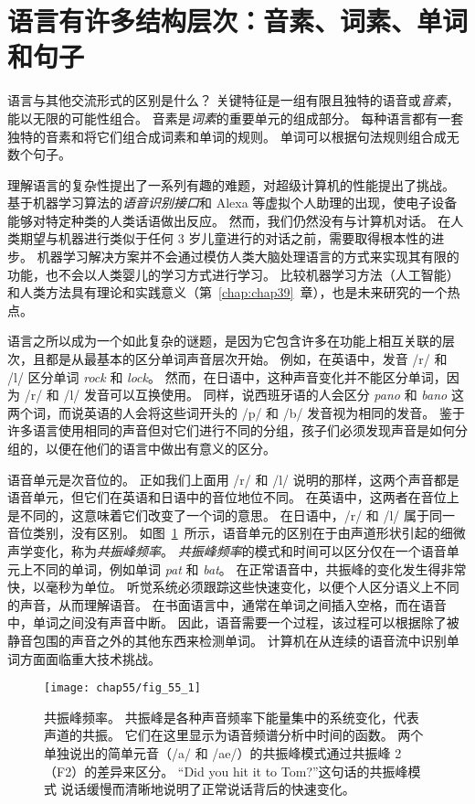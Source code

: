 \section{语言有许多结构层次：音素、词素、单词和句子}

语言与其他交流形式的区别是什么？
关键特征是一组有限且独特的语音或\textit{音素}，能以无限的可能性组合。
音素是\textit{词素}的重要单元的组成部分。
每种语言都有一套独特的音素和将它们组合成词素和单词的规则。
单词可以根据句法规则组合成无数个句子。


理解语言的复杂性提出了一系列有趣的难题，对超级计算机的性能提出了挑战。
基于机器学习算法的\textit{语音识别接口}和 Alexa 等虚拟个人助理的出现，使电子设备能够对特定种类的人类话语做出反应。
然而，我们仍然没有与计算机对话。
在人类期望与机器进行类似于任何 3 岁儿童进行的对话之前，需要取得根本性的进步。
机器学习解决方案并不会通过模仿人类大脑处理语言的方式来实现其有限的功能，也不会以人类婴儿的学习方式进行学习。
比较机器学习方法（人工智能）和人类方法具有理论和实践意义（第~\ref{chap:chap39}~章），也是未来研究的一个热点。


语言之所以成为一个如此复杂的谜题，是因为它包含许多在功能上相互关联的层次，且都是从最基本的区分单词声音层次开始。
例如，在英语中，发音 /r/ 和 /l/ 区分单词 \textit{rock} 和 \textit{lock}。
然而，在日语中，这种声音变化并不能区分单词，因为 /r/ 和 /l/ 发音可以互换使用。
同样，说西班牙语的人会区分 \textit{pano} 和 \textit{bano} 这两个词，而说英语的人会将这些词开头的 /p/ 和 /b/ 发音视为相同的发音。
鉴于许多语言使用相同的声音但对它们进行不同的分组，孩子们必须发现声音是如何分组的，以便在他们的语言中做出有意义的区分。


语音单元是次音位的。
正如我们上面用 /r/ 和 /l/ 说明的那样，这两个声音都是语音单元，但它们在英语和日语中的音位地位不同。
在英语中，这两者在音位上是不同的，这意味着它们改变了一个词的意思。
在日语中，/r/ 和 /l/ 属于同一音位类别，没有区别。
如图~\ref{fig:55_1}~所示，语音单元的区别在于由声道形状引起的细微声学变化，称为\textit{共振峰频率}。
\textit{共振峰频率}的模式和时间可以区分仅在一个语音单元上不同的单词，例如单词 \textit{pat} 和 \textit{bat}。
在正常语音中，共振峰的变化发生得非常快，以毫秒为单位。
听觉系统必须跟踪这些快速变化，以便个人区分语义上不同的声音，从而理解语音。
在书面语言中，通常在单词之间插入空格，而在语音中，单词之间没有声音中断。
因此，语音需要一个过程，该过程可以根据除了被静音包围的声音之外的其他东西来检测单词。
计算机在从连续的语音流中识别单词方面面临重大技术挑战。


\begin{figure}[htbp]
	\centering
	\texttt{[image: chap55/fig\_55\_1]}
	\caption{共振峰频率。
	共振峰是各种声音频率下能量集中的系统变化，代表声道的共振。
	它们在这里显示为语音频谱分析中时间的函数。
	两个单独说出的简单元音（/a/ 和 /ae/）的共振峰模式通过共振峰 2（F2）的差异来区分。
	“Did you hit it to Tom?”这句话的共振峰模式 说话缓慢而清晰地说明了正常说话背后的快速变化。}
	\label{fig:55_1}
\end{figure}


